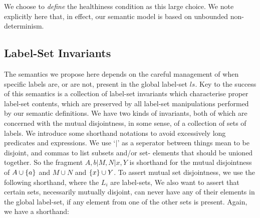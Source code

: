 We choose to \emph{define} the healthiness condition as
this large choice.
We note explicitly here that, in effect, our semantic model is based on
unbounded non-determinism.


\subsection{Label-Set Invariants}


The semantics we propose here depends on the careful management
of when specific labels are, or are not,
present in the global label-set $ls$.
Key to the success of this semantics is a collection of label-set invariants
which characterise proper label-set contents,
which are preserved by all label-set manipulations performed
by our semantic definitions.
We have two kinds of invariants,
both of which are concerned with the mutual disjointness, in some sense,
of a collection of sets of labels.
We introduce some shorthand notations to avoid excessively long predicates and expressions. We use `$\mid$' as a seperator between things mean to be disjoint,
and commas to list subsets and/or set- elements that should be unioned together.
So the fragment $ A,b | M,N | x,Y $
is shorthand for the mutual disjointness of
$A \cup \{{a}\}$ and $M \cup N$ and $\{{x}\} \cup Y$.
To assert mutual set disjointness,
we use the following shorthand, where the $L_i$ are label-sets,
We also want to assert that certain sets, necessarily mutually disjoint,
can never have any of their elements in the global label-set,
if any element from one of the other sets is present.
Again, we have a shorthand:

